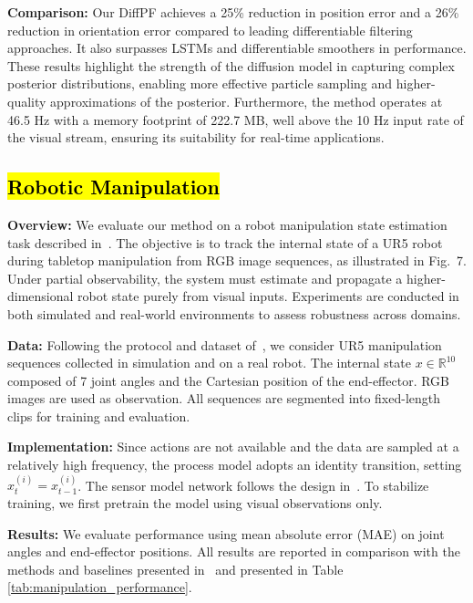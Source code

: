 \textbf{Comparison:} Our DiffPF achieves a 25\% reduction in position error and a 26\% reduction in orientation error compared to leading differentiable filtering approaches. It also surpasses LSTMs and differentiable smoothers in performance. 
These results highlight the strength of the diffusion model in capturing complex posterior distributions, enabling more effective particle sampling and higher-quality approximations of the posterior. Furthermore, the method operates at 46.5 Hz with a memory footprint of 222.7 MB, well above the 10 Hz input rate of the visual stream, ensuring its suitability for real-time applications.

\subsection{\texorpdfstring{\hl{Robotic Manipulation}}{Robotic Manipulation}}
\textbf{Overview:} 
We evaluate our method on a robot manipulation state estimation task described in~\cite{liu2023alpha}. The objective is to track the internal state of a UR5 robot during tabletop manipulation from RGB image sequences, as illustrated in Fig.~7. Under partial observability, the system must estimate and propagate a higher-dimensional robot state purely from visual inputs. Experiments are conducted in both simulated and real-world environments to assess robustness across domains.

\textbf{Data:}
Following the protocol and dataset of~\cite{liu2023alpha}, we consider UR5 manipulation sequences collected in simulation and on a real robot. The internal state $x \in \mathbb{R}^{10}$ composed of 7 joint angles and the Cartesian position of the end-effector. RGB images are used as observation. All sequences are segmented into fixed-length clips for training and evaluation.

\textbf{Implementation:} 
Since actions are not available and the data are sampled at a relatively high frequency, the process model adopts an identity transition, setting $\hat{x}_t^{(i)} = x_{t-1}^{(i)}$. The sensor model network follows the design in~\cite{liu2023alpha}. To stabilize training, we first pretrain the model using visual observations only.

\textbf{Results:} 
We evaluate performance using mean absolute error (MAE) on joint angles and end-effector positions. All results are reported in comparison with the methods and baselines presented in~\cite{liu2023alpha, liu2023enhancing} and presented in Table \ref{tab:manipulation_performance}. 

